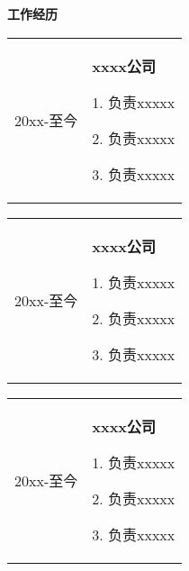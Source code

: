 \begin{flushleft}
  \Large\textbf{工作经历}
  \\[4mm]
  \normalsize{
    \begin{tabular}{p{} p{}}
      20xx-至今 & \textbf{xxxx公司}
                  \par 1. 负责xxxxx
                  \par 2. 负责xxxxx
                  \par 3. 负责xxxxx\\[4mm]
    \end{tabular}
    
    \begin{tabular}{p{} p{}}
      20xx-至今 & \textbf{xxxx公司}
                  \par 1. 负责xxxxx
                  \par 2. 负责xxxxx
                  \par 3. 负责xxxxx\\[4mm]
    \end{tabular}
    
    \begin{tabular}{p{} p{}}
      20xx-至今 & \textbf{xxxx公司}
                  \par 1. 负责xxxxx
                  \par 2. 负责xxxxx
                  \par 3. 负责xxxxx\\[4mm]
    \end{tabular}
  } 
\end{flushleft}